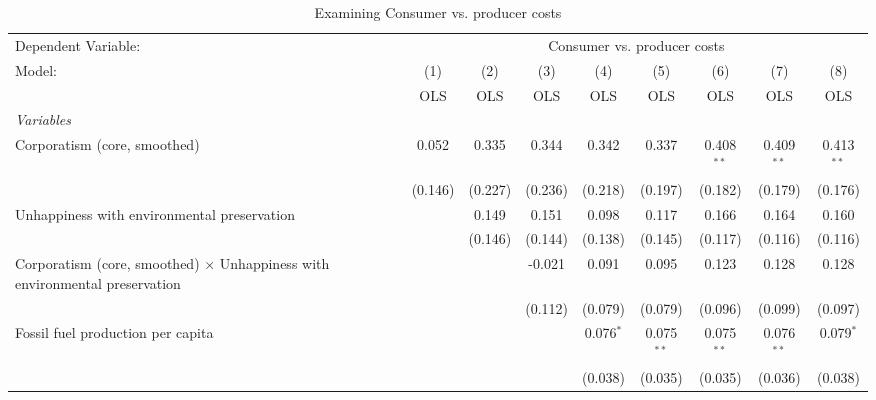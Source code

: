 
\begin{table}[htbp]
   \caption{Examining Consumer vs. producer costs}
   \centering
   \begin{tabular}{lcccccccc}
      \toprule
      Dependent Variable: & \multicolumn{8}{c}{Consumer vs. producer costs}\\
      Model:                                                                             & (1)     & (2)     & (3)     & (4)         & (5)          & (6)          & (7)          & (8)\\  
                                                                                         &  OLS    & OLS     & OLS     & OLS         & OLS          & OLS          & OLS          & OLS\\  
      \midrule
      \emph{Variables}\\
      Corporatism (core, smoothed)                                                       & 0.052   & 0.335   & 0.344   & 0.342       & 0.337        & 0.408$^{**}$ & 0.409$^{**}$ & 0.413$^{**}$\\   
                                                                                         & (0.146) & (0.227) & (0.236) & (0.218)     & (0.197)      & (0.182)      & (0.179)      & (0.176)\\   
      Unhappiness with environmental preservation                                        &         & 0.149   & 0.151   & 0.098       & 0.117        & 0.166        & 0.164        & 0.160\\   
                                                                                         &         & (0.146) & (0.144) & (0.138)     & (0.145)      & (0.117)      & (0.116)      & (0.116)\\   
      Corporatism (core, smoothed) $\times$ Unhappiness with environmental preservation  &         &         & -0.021  & 0.091       & 0.095        & 0.123        & 0.128        & 0.128\\   
                                                                                         &         &         & (0.112) & (0.079)     & (0.079)      & (0.096)      & (0.099)      & (0.097)\\   
      Fossil fuel production per capita                                                  &         &         &         & 0.076$^{*}$ & 0.075$^{**}$ & 0.075$^{**}$ & 0.076$^{**}$ & 0.079$^{*}$\\   
                                                                                         &         &         &         & (0.038)     & (0.035)      & (0.035)      & (0.036)      & (0.038)\\   

\end{tabular}
\end{table}

